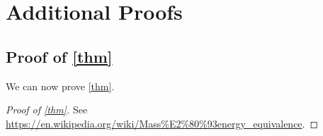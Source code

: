 \chapter{Additional Proofs}
\section{Proof of \autoref{thm}}\label{appendix}
We can now prove \autoref{thm}.
\begin{proof}[Proof of \autoref{thm}]
	See \url{https://en.wikipedia.org/wiki/Mass%E2%80%93energy_equivalence}.
\end{proof}